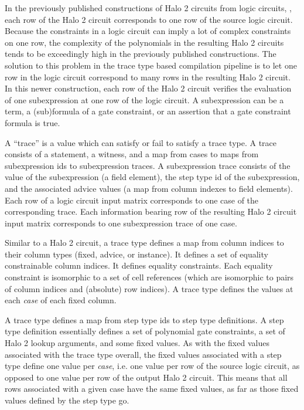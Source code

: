 \documentclass[11pt]{article}
\begin{document}
In the previously published constructions of Halo 2 circuits from logic circuits, \cite{sigma11,sigma11-poly-bounds}, each row of the Halo 2 circuit corresponds to one row of the source logic circuit. Because the constraints in a logic circuit can imply a lot of complex constraints on one row, the complexity of the polynomials in the resulting Halo 2 circuits tends to be exceedingly high in the previously published constructions. The solution to this problem in the trace type based compilation pipeline is to let one row in the logic circuit correspond to many rows in the resulting Halo 2 circuit. In this newer construction, each row of the Halo 2 circuit verifies the evaluation of one subexpression at one row of the logic circuit. A subexpression can be a term, a (sub)formula of a gate constraint, or an assertion that a gate constraint formula is true.

A ``trace'' is a value which can satisfy or fail to satisfy a trace type. A trace consists of a statement, a witness, and a map from cases to maps from subexpression ids to subexpression traces. A subexpression trace consists of the value of the subexpression (a field element), the step type id of the subexpression, and the associated advice values (a map from column indexes to field elements). Each row of a logic circuit input matrix corresponds to one case of the corresponding trace. Each information bearing row of the resulting Halo 2 circuit input matrix corresponds to one subexpression trace of one case.

Similar to a Halo 2 circuit, a trace type defines a map from column indices to their column types (fixed, advice, or instance). It defines a set of equality constrainable column indices. It defines equality constraints. Each equality constraint is isomorphic to a set of cell references (which are isomorphic to pairs of column indices and (absolute) row indices). A trace type defines the values at each \emph{case}\/ of each fixed column.

A trace type defines a map from step type ids to step type definitions. A step type definition essentially defines a set of polynomial gate constraints, a set of Halo 2 lookup arguments, and some fixed values. As with the fixed values associated with the trace type overall, the fixed values associated with a step type define one value per \emph{case}, i.e. one value per row of the source logic circuit, as opposed to one value per row of the output Halo 2 circuit. This means that all rows associated with a given case have the same fixed values, as far as those fixed values defined by the step type go.
\end{document}
